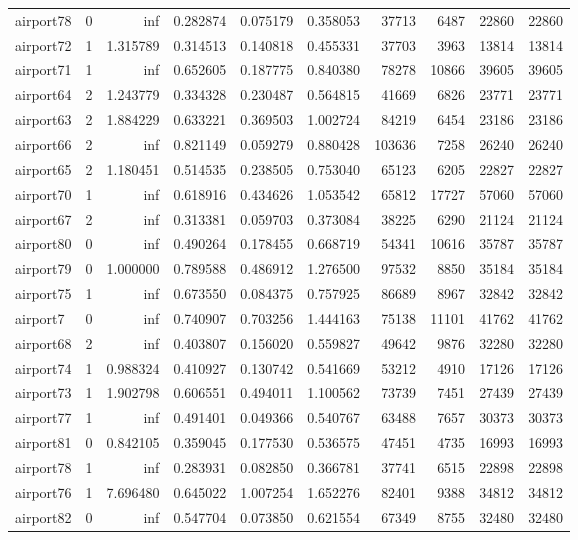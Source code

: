 \begin{longtable}{|l|r|r|r|r|r|r|r|r|r|}
airport78 & 0 & inf & 0.282874 & 0.075179 & 0.358053 & 37713 & 6487 & 22860 & 22860 \\
airport72 & 1 & 1.315789 & 0.314513 & 0.140818 & 0.455331 & 37703 & 3963 & 13814 & 13814 \\
airport71 & 1 & inf & 0.652605 & 0.187775 & 0.840380 & 78278 & 10866 & 39605 & 39605 \\
airport64 & 2 & 1.243779 & 0.334328 & 0.230487 & 0.564815 & 41669 & 6826 & 23771 & 23771 \\
airport63 & 2 & 1.884229 & 0.633221 & 0.369503 & 1.002724 & 84219 & 6454 & 23186 & 23186 \\
airport66 & 2 & inf & 0.821149 & 0.059279 & 0.880428 & 103636 & 7258 & 26240 & 26240 \\
airport65 & 2 & 1.180451 & 0.514535 & 0.238505 & 0.753040 & 65123 & 6205 & 22827 & 22827 \\
airport70 & 1 & inf & 0.618916 & 0.434626 & 1.053542 & 65812 & 17727 & 57060 & 57060 \\
airport67 & 2 & inf & 0.313381 & 0.059703 & 0.373084 & 38225 & 6290 & 21124 & 21124 \\
airport80 & 0 & inf & 0.490264 & 0.178455 & 0.668719 & 54341 & 10616 & 35787 & 35787 \\
airport79 & 0 & 1.000000 & 0.789588 & 0.486912 & 1.276500 & 97532 & 8850 & 35184 & 35184 \\
airport75 & 1 & inf & 0.673550 & 0.084375 & 0.757925 & 86689 & 8967 & 32842 & 32842 \\
airport7 & 0 & inf & 0.740907 & 0.703256 & 1.444163 & 75138 & 11101 & 41762 & 41762 \\
airport68 & 2 & inf & 0.403807 & 0.156020 & 0.559827 & 49642 & 9876 & 32280 & 32280 \\
airport74 & 1 & 0.988324 & 0.410927 & 0.130742 & 0.541669 & 53212 & 4910 & 17126 & 17126 \\
airport73 & 1 & 1.902798 & 0.606551 & 0.494011 & 1.100562 & 73739 & 7451 & 27439 & 27439 \\
airport77 & 1 & inf & 0.491401 & 0.049366 & 0.540767 & 63488 & 7657 & 30373 & 30373 \\
airport81 & 0 & 0.842105 & 0.359045 & 0.177530 & 0.536575 & 47451 & 4735 & 16993 & 16993 \\
airport78 & 1 & inf & 0.283931 & 0.082850 & 0.366781 & 37741 & 6515 & 22898 & 22898 \\
airport76 & 1 & 7.696480 & 0.645022 & 1.007254 & 1.652276 & 82401 & 9388 & 34812 & 34812 \\
airport82 & 0 & inf & 0.547704 & 0.073850 & 0.621554 & 67349 & 8755 & 32480 & 32480 \\

\end{longtable}
